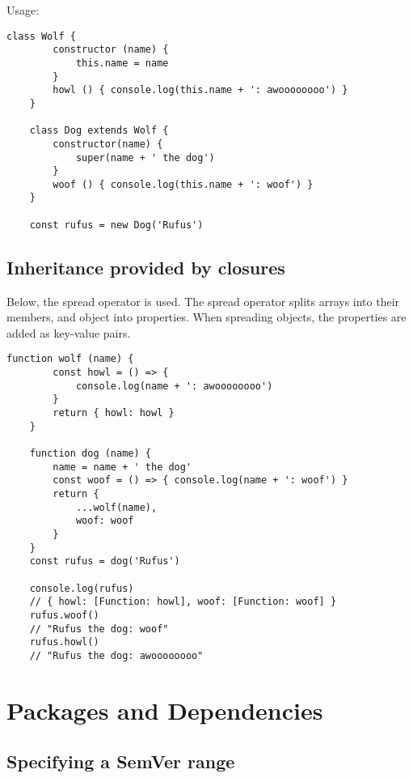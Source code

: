 \documentclass{scrartcl}
\begin{document}
Usage:

\begin{lstlisting}[style=ES6]
    class Wolf {
        constructor (name) {
            this.name = name
        }
        howl () { console.log(this.name + ': awoooooooo') }
    }

    class Dog extends Wolf {
        constructor(name) {
            super(name + ' the dog')
        }
        woof () { console.log(this.name + ': woof') }
    }

    const rufus = new Dog('Rufus')
\end{lstlisting}

\subsection{Inheritance provided by closures}

Below, the spread operator is used. The spread operator splits arrays into their members, and object into properties.
When spreading objects, the properties are added as key-value pairs.

\begin{lstlisting}[style=ES6]
    function wolf (name) {
        const howl = () => {
            console.log(name + ': awoooooooo')
        }
        return { howl: howl }
    }

    function dog (name) {
        name = name + ' the dog'
        const woof = () => { console.log(name + ': woof') }
        return {
            ...wolf(name),
            woof: woof
        }
    }
    const rufus = dog('Rufus')

    console.log(rufus)
    // { howl: [Function: howl], woof: [Function: woof] }
    rufus.woof()
    // "Rufus the dog: woof"
    rufus.howl()
    // "Rufus the dog: awoooooooo"
\end{lstlisting}

\section{Packages and Dependencies}

\subsection{Specifying a SemVer range}
\end{document}
